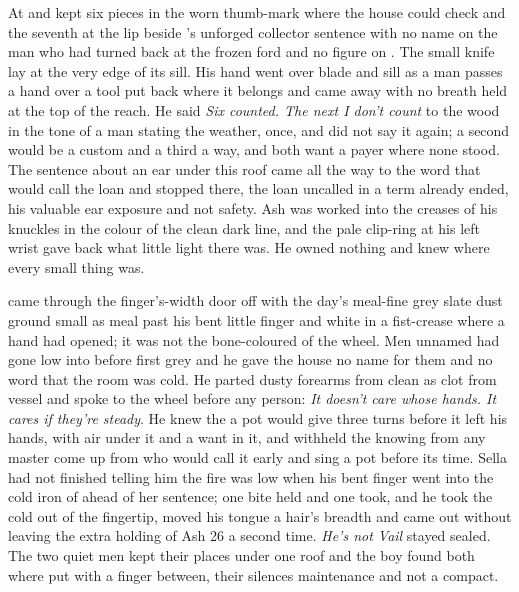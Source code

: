 At  and   kept six pieces in the worn thumb-mark where the house could check and the seventh at the lip beside 's unforged collector sentence with no name on the man who had turned back at the frozen ford and no figure on . The small knife lay at the very edge of its sill. His hand went over blade and sill as a man passes a hand over a tool put back where it belongs and came away with no breath held at the top of the reach. He said \emph{Six counted. The next I don't count} to the wood in the tone of a man stating the weather, once, and did not say it again; a second would be a custom and a third a way, and both want a payer where none stood. The sentence about an ear under this roof came all the way to the word that would call the loan and stopped there, the loan uncalled in a term already ended, his valuable ear exposure and not safety. Ash was worked into the creases of his knuckles in the colour of the clean dark line, and the pale clip-ring at his left wrist gave back what little light there was. He owned nothing and knew where every small thing was.

 came through the finger's-width door off  with the day's meal-fine grey slate dust ground small as meal past his bent little finger and white in a fist-crease where a hand had opened; it was not the bone-coloured  of the wheel. Men unnamed had gone low into  before first grey and he gave the house no name for them and no word that the room was cold. He parted dusty forearms from clean as clot from vessel and spoke to the wheel before any person: \emph{It doesn't care whose hands. It cares if they're steady}. He knew the  a pot would give three turns before it left his hands, with air under it and a want in it, and withheld the knowing from any master come up from  who would call it early and sing a pot before its time. Sella had not finished telling him the fire was low when his bent finger went into the cold iron of  ahead of her sentence; one bite held and one took, and he took the cold out of the fingertip, moved his tongue a hair's breadth and came out without leaving the extra holding of Ash 26 a second time. \emph{He's not Vail} stayed sealed. The two quiet men kept their places under one roof and the boy found both where put with a finger between, their silences maintenance and not a compact.

